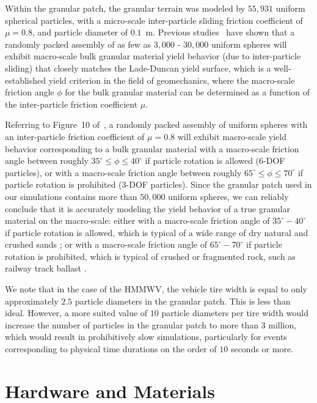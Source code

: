 \documentclass[12pt,onecolumn]{report}
\begin{document}
Within the granular patch, the granular terrain was modeled by $55,931$ uniform spherical particles, with a micro-scale inter-particle sliding friction coefficient of $\mu = 0.8$, and particle diameter of $0.1$~m.  Previous studies~\cite{fleischmannetalGEGE2014} have shown that 
a randomly packed assembly of as few as $3,000$ - $30,000$ uniform spheres will exhibit macro-scale bulk granular material yield behavior (due to inter-particle sliding) that closely matches the Lade-Duncan yield surface, which is a well-established yield criterion in the field of geomechanics, where the macro-scale friction angle $\phi$ for the bulk granular material can be determined as a function of the inter-particle friction coefficient $\mu$.

Referring to Figure~10 of~\cite{fleischmannetalGEGE2014}, a randomly packed assembly of uniform spheres with an inter-particle friction coefficient of $\mu = 0.8$ will exhibit macro-scale yield behavior corresponding to a bulk granular material with a macro-scale friction angle between roughly $35^\circ \leq \phi \leq 40^\circ$ if particle rotation is allowed (6-DOF particles), or with a macro-scale friction angle between roughly $65^\circ \leq \phi \leq 70^\circ$ if particle rotation is prohibited (3-DOF particles).
%
Since the granular patch used in our simulations contains more than $50,000$ uniform spheres, we can reliably conclude that it is accurately modeling the yield behavior of a true granular material on the macro-scale: either with a macro-scale friction angle of $35^\circ-40^\circ$ if particle rotation is allowed, which is typical of a wide range of dry natural and crushed sands \cite{Cho&Dodds&Santamarina2006}; or with a macro-scale friction angle of $65^\circ-70^\circ$ if particle rotation is prohibited, which is typical of crushed or fragmented rock, such as railway track ballast \cite{Indraratnaetal1998}.

We note that in the case of the HMMWV, the vehicle tire width is equal to only approximately $2.5$ particle diameters in the granular patch.  This is less than ideal.  However, a more suited value of $10$ particle diameters per tire width would increase the number of particles in the granular patch to more than $3$ million, which would result in prohibitively slow simulations, particularly for events corresponding to physical time durations on the order of $10$ seconds or more.

\section{Hardware and Materials}\label{s:Hardware}
\end{document}
